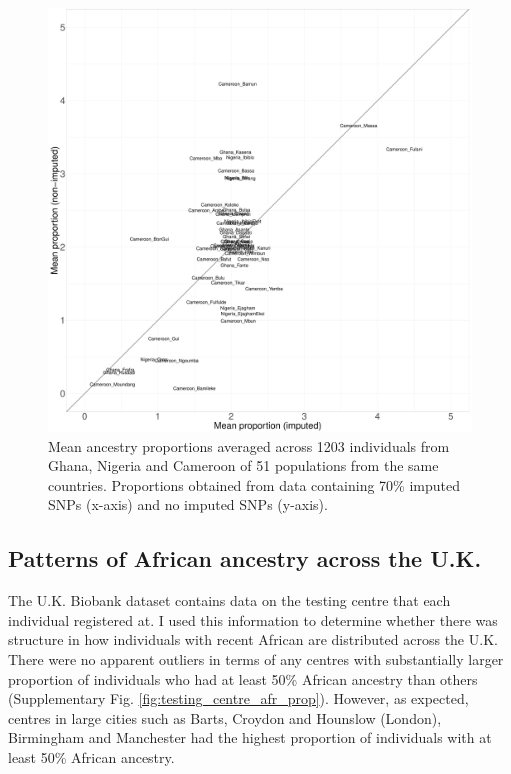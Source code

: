 \begin{figure}[htp]
    \centering
    \includegraphics[width=1.0\textwidth]{../images/chapter3/SOURCEFIND_imp_nonimp.pdf}
    \caption{Mean ancestry proportions averaged across 1203 individuals from Ghana, Nigeria and Cameroon of 51 populations from the same countries. Proportions obtained from data containing 70\% imputed SNPs (x-axis) and no imputed SNPs (y-axis).}
    \label{fig:SOURCEFIND_imp_nonimp}
\end{figure}


\subsection{Patterns of African ancestry across the U.K.}

The U.K. Biobank dataset contains data on the testing centre that each individual registered at. I used this information to determine whether there was structure in how individuals with recent African  are distributed across the U.K. There were no apparent outliers in terms of any centres with substantially larger proportion of individuals who had at least 50\% African ancestry than others (Supplementary Fig. \ref{fig:testing_centre_afr_prop}). However, as expected, centres in large cities such as Barts, Croydon and Hounslow (London), Birmingham and Manchester had the highest proportion of individuals with at least 50\% African ancestry.

